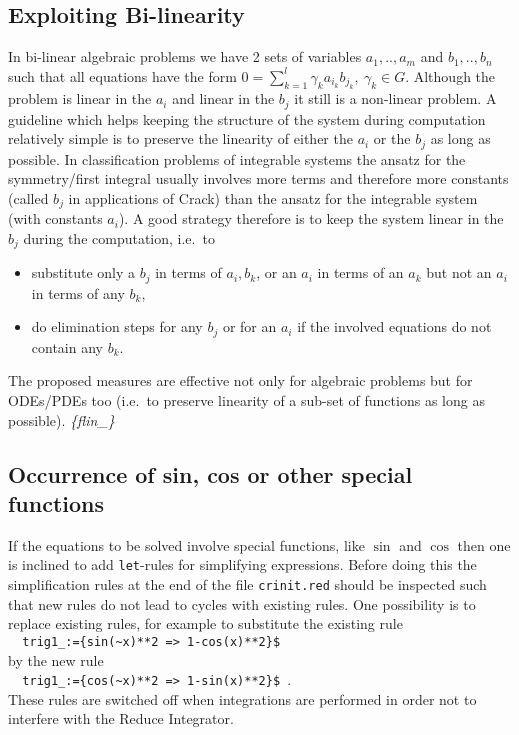 \documentclass[12pt]{article}
\begin{document}
\subsection{Exploiting Bi-linearity}
  In bi-linear algebraic problems we have 2 sets of variables
  $a_1,..,a_m$ and $b_1,..,b_n$ such that all equations have
  the form $0=\sum_{k=1}^l \gamma_k a_{i_k}b_{j_k}, \ \gamma_k \in G$.
  Although the
  problem is linear in the $a_i$ and linear in the $b_j$ it still is a
  non-linear problem. A guideline which helps keeping the structure of
  the system during computation relatively simple is to preserve the
  linearity of either the $a_i$ or the $b_j$ as long as possible. In
  classification problems of integrable systems
  the ansatz for the symmetry/first integral
  usually involves more terms and therefore more constants (called
  $b_j$ in applications of {\sc Crack}) than the ansatz for the
  integrable system (with constants $a_i$).  A good strategy therefore
  is to keep the system linear in the $b_j$ during the computation,
  i.e.\ to
  \begin{itemize}
  \item substitute only a $b_j$ in terms of $a_i, b_k$, or an $a_i$
    in terms of an $a_k$ but not an $a_i$ in terms of any $b_k$,
  \item do elimination steps for any $b_j$ or for an
    $a_i$ if the involved equations do not contain any $b_k$.
  \end{itemize}
  The proposed measures are effective not only for algebraic problems
  but for ODEs/PDEs too (i.e.\ to preserve linearity of a sub-set of
  functions as long as possible).
  {\em \{flin\_\} }

\subsection{Occurrence of sin, cos or other special functions}

  If the equations to be solved involve special functions, like $\sin$
  and $\cos$ then one is inclined to add {\tt let}-rules for simplifying
  expressions. Before doing this the simplification rules at the end of
  the file {\tt crinit.red} should be inspected such that new rules do
  not lead to cycles with existing rules. One possibility is to replace
  existing rules, for example to substitute the existing rule \\
  \verb+  trig1_:={sin(~x)**2 => 1-cos(x)**2}$ + \\ by the new rule \\
  \verb+  trig1_:={cos(~x)**2 => 1-sin(x)**2}$ +.\\
  These rules are switched off when integrations are performed in order
  not to interfere with the {\sc Reduce} Integrator.
\end{document}
